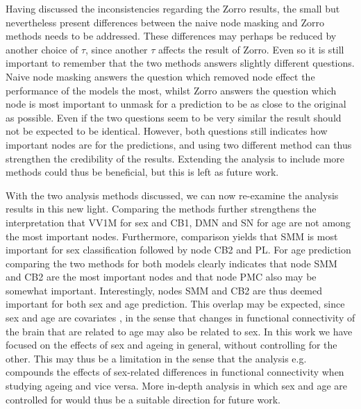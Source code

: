 Having discussed the inconsistencies regarding the Zorro results, the small but nevertheless present differences between the naive node masking and Zorro methods needs to be addressed. These differences may perhaps be reduced by another choice of $\tau$, since another $\tau$ affects the result of Zorro. Even so it is still important to remember that the two methods answers slightly different questions. Naive node masking answers the question which removed node effect the performance of the models the most, whilst Zorro answers the question which node is most important to unmask for a prediction to be as close to the original as possible. Even if the two questions seem to be very similar the result should not be expected to be identical. However, both questions still indicates how important nodes are for the predictions, and using two different method can thus strengthen the credibility of the results. Extending the analysis to include more methods could thus be beneficial, but this is left as future work.

With the two analysis methods discussed, we can now re-examine the analysis results in this new light. Comparing the methods further strengthens the interpretation that VV1M for sex and CB1, DMN and SN for age are not among the most important nodes. Furthermore, comparison yields that SMM is most important for sex classification followed by node CB2 and PL. For age prediction comparing the two methods for both models clearly indicates that node SMM and CB2 are the most important nodes and that node PMC also may be somewhat important. Interestingly, nodes SMM and CB2 are thus deemed important for both sex and age prediction. This overlap may be expected, since sex and age are covariates \cite{zhang_covariates}, in the sense that changes in functional connectivity of the brain that are related to age may also be related to sex. In this work we have focused on the effects of sex and ageing in general, without controlling for the other. This may thus be a limitation in the sense that the analysis e.g. compounds the effects of sex-related differences in functional connectivity when studying ageing and vice versa. More in-depth analysis in which sex and age are controlled for would thus be a suitable direction for future work.

